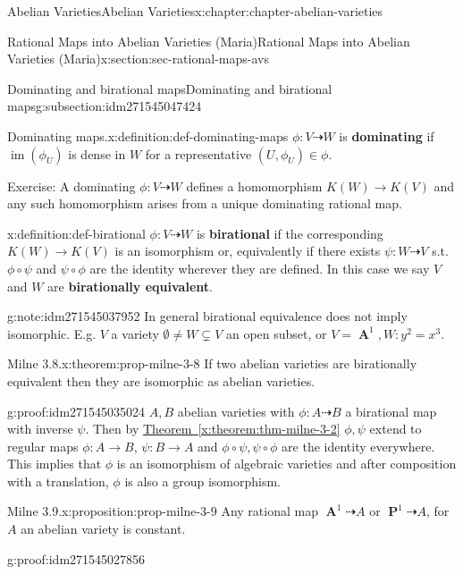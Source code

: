 \documentclass[oneside,10pt,]{book}
\newcommand{\terminology}[1]{\textbf{#1}}
\numberwithin{equation}{section}
\DeclareMathOperator{\im}{im}
\DeclareMathOperator{\aff}{\mathbf{A}}
\DeclareMathOperator{\PP}{\mathbf{P}}
\begin{document}
\begin{chapterptx}{Abelian Varieties}{}{Abelian Varieties}{}{}{x:chapter:chapter-abelian-varieties}
\begin{sectionptx}{Rational Maps into Abelian Varieties (Maria)}{}{Rational Maps into Abelian Varieties (Maria)}{}{}{x:section:sec-rational-maps-avs}
\begin{subsectionptx}{Dominating and birational maps}{}{Dominating and birational maps}{}{}{g:subsection:idm271545047424}
\begin{definition}{Dominating maps.}{x:definition:def-dominating-maps}%
\(\phi\colon V \dashrightarrow W\) is \terminology{dominating} if \(\im (\phi_U)\) is dense in \(W\) for a representative \((U,\phi_U)\in \phi\).%
\end{definition}
Exercise: A dominating \(\phi\colon V\dashrightarrow W\) defines a homomorphism \(K(W) \to K(V)\) and any such homomorphism arises from a unique dominating rational map.%
\begin{definition}{}{x:definition:def-birational}%
\(\phi\colon V \dashrightarrow W\) is \terminology{birational} if the corresponding \(K(W)\to K(V)\) is an isomorphism or, equivalently if there exists \(\psi\colon W\dashrightarrow V \) s.t. \(\phi\circ \psi\) and \(\psi\circ\phi\) are the identity wherever they are defined. In this case we say \(V\) and \(W\) are \terminology{birationally equivalent}.%
\end{definition}
\begin{note}{}{g:note:idm271545037952}%
In general birational equivalence does not imply isomorphic. E.g. \(V\) a variety \(\emptyset \ne W\subsetneq V\) an open subset, or \(V= \aff^1, W \colon y^2 =x^3\).%
\end{note}
\begin{theorem}{Milne 3.8.}{}{x:theorem:prop-milne-3-8}%
If two abelian varieties are birationally equivalent then they are isomorphic as abelian varieties.%
\end{theorem}
\begin{proofptx}{}{g:proof:idm271545035024}
\(A,B\) abelian varieties with \(\phi \colon A\dashrightarrow B\) a birational map with inverse \(\psi\). Then by \hyperref[x:theorem:thm-milne-3-2]{Theorem~\ref{x:theorem:thm-milne-3-2}} \(\phi ,\psi\) extend to regular maps   \(\phi\colon A \to B \), \(\psi\colon B\to A\) and \(\phi\circ\psi,\psi\circ\phi\) are  the identity everywhere. This implies that \(\phi\) is an isomorphism of  algebraic varieties and after composition with a translation, \(\phi\) is also a group isomorphism.%
\end{proofptx}
\begin{proposition}{Milne 3.9.}{}{x:proposition:prop-milne-3-9}%
Any rational map \(\aff^1 \dashrightarrow A\) or \(\PP^1 \dashrightarrow A\), for \(A\) an abelian variety is constant.%
\end{proposition}
\begin{proofptx}{}{g:proof:idm271545027856}

\end{proofptx}
\end{subsectionptx}
\end{sectionptx}
\end{chapterptx}
\end{document}
